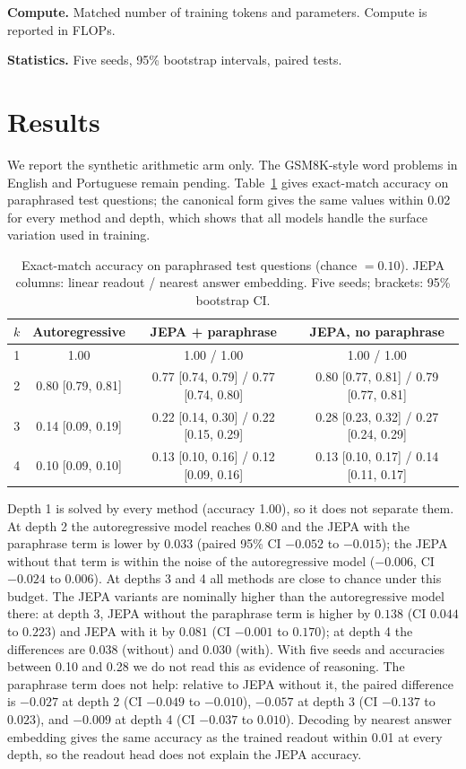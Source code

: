 \documentclass[conference]{IEEEtran}
\begin{document}
\textbf{Compute.} Matched number of training tokens and parameters. Compute is reported in FLOPs.

\textbf{Statistics.} Five seeds, 95\% bootstrap intervals, paired tests.

\section{Results}
We report the synthetic arithmetic arm only. The GSM8K-style word problems in English and Portuguese remain pending. Table~\ref{tab:reasoning} gives exact-match accuracy on paraphrased test questions; the canonical form gives the same values within 0.02 for every method and depth, which shows that all models handle the surface variation used in training.

\begin{table}[!t]
\caption{Exact-match accuracy on paraphrased test questions (chance $=0.10$). JEPA columns: linear readout / nearest answer embedding. Five seeds; brackets: 95\% bootstrap CI.}
\label{tab:reasoning}
\centering
\small
\small
\begin{tabular}{cccc}
\hline
$k$ & Autoregressive & JEPA + paraphrase & JEPA, no paraphrase \\
\hline
1 & 1.00 & 1.00 / 1.00 & 1.00 / 1.00 \\
2 & 0.80 [0.79, 0.81] & 0.77 [0.74, 0.79] / 0.77 [0.74, 0.80] & 0.80 [0.77, 0.81] / 0.79 [0.77, 0.81] \\
3 & 0.14 [0.09, 0.19] & 0.22 [0.14, 0.30] / 0.22 [0.15, 0.29] & 0.28 [0.23, 0.32] / 0.27 [0.24, 0.29] \\
4 & 0.10 [0.09, 0.10] & 0.13 [0.10, 0.16] / 0.12 [0.09, 0.16] & 0.13 [0.10, 0.17] / 0.14 [0.11, 0.17] \\
\hline
\end{tabular}
\end{table}

Depth 1 is solved by every method (accuracy 1.00), so it does not separate them. At depth 2 the autoregressive model reaches 0.80 and the JEPA with the paraphrase term is lower by $0.033$ (paired 95\% CI $-0.052$ to $-0.015$); the JEPA without that term is within the noise of the autoregressive model ($-0.006$, CI $-0.024$ to $0.006$). At depths 3 and 4 all methods are close to chance under this budget. The JEPA variants are nominally higher than the autoregressive model there: at depth 3, JEPA without the paraphrase term is higher by $0.138$ (CI $0.044$ to $0.223$) and JEPA with it by $0.081$ (CI $-0.001$ to $0.170$); at depth 4 the differences are $0.038$ (without) and $0.030$ (with). With five seeds and accuracies between 0.10 and 0.28 we do not read this as evidence of reasoning. The paraphrase term does not help: relative to JEPA without it, the paired difference is $-0.027$ at depth 2 (CI $-0.049$ to $-0.010$), $-0.057$ at depth 3 (CI $-0.137$ to $0.023$), and $-0.009$ at depth 4 (CI $-0.037$ to $0.010$). Decoding by nearest answer embedding gives the same accuracy as the trained readout within 0.01 at every depth, so the readout head does not explain the JEPA accuracy.
\end{document}
